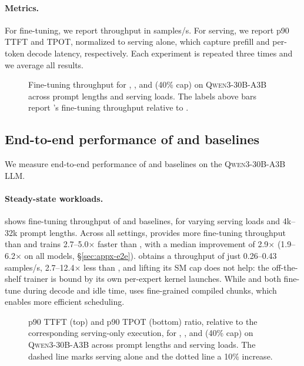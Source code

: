 \paragraph{Metrics.}
For fine-tuning, we report throughput in samples/s.
For serving, we report p90 \ac{TTFT} and \ac{TPOT}, normalized to serving alone, which capture prefill and per-token decode latency, respectively.
Each experiment is repeated three times and we average all results.

\begin{figure}[t]
  \centering
  \caption{Fine-tuning throughput for \sys, \llmstation, and \uncoord (40\% cap) on \textsc{Qwen3-30B-A3B} across prompt lengths and serving loads. The labels above bars report \sys's fine-tuning throughput relative to \llmstation.}
  \label{fig:eval-e2e-tput}
\end{figure}

\subsection{End-to-end performance of \sys and baselines}
\label{sec:eval-e2e}

We measure end-to-end performance of \sys and baselines on the \textsc{Qwen3-30B-A3B} \ac{LLM}.

\paragraph{Steady-state workloads.}
 shows fine-tuning throughput of \sys and baselines, for varying serving loads and 4k--32k prompt lengths.
Across all settings, \sys provides more fine-tuning throughput than \llmstation and trains 2.7--5.0$\times$ faster than \llmstation, with a median improvement of 2.9$\times$ (1.9--6.2$\times$ on all models, \S\ref{sec:appx-e2e}).
\Uncoord obtains a throughput of just 0.26--0.43 samples/s, 2.7--12.4$\times$ less than \sys, and lifting its \ac{SM} cap does not help: the off-the-shelf trainer is bound by its own per-expert kernel launches.
While \sys and \llmstation both fine-tune during decode and idle time, \sys uses fine-grained compiled chunks, which enables more efficient scheduling.

\begin{figure}[t]
  \centering
  \caption{p90 \ac{TTFT} (top) and p90 \ac{TPOT} (bottom) ratio, relative to the corresponding serving-only execution, for \sys, \llmstation, and \uncoord (40\% cap) on \textsc{Qwen3-30B-A3B} across prompt lengths and serving loads. The dashed line marks serving alone and the dotted line a 10\% increase.}
  \label{fig:eval-e2e-lat}
\end{figure}

